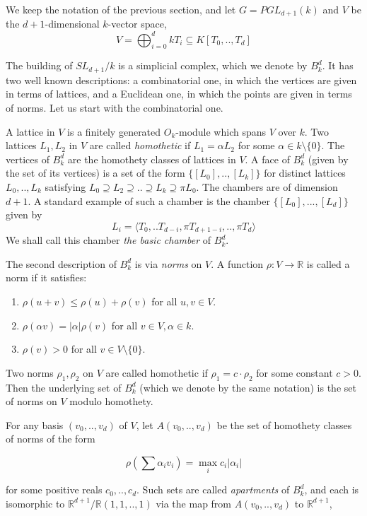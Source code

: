 \documentclass{amsart}
\theoremstyle{theorem}
\theoremstyle{lemma}
\theoremstyle{prop}
\theoremstyle{definition}
\theoremstyle{corollary}
\theoremstyle{remark}
\newcommand{\R}{\mathbb{R}}
\begin{document}
We keep the notation of the previous section, and let $G=PGL_{d+1}(k)$ and $V$ be the $d+1$-dimensional $k$-vector space,
$$ V=\bigoplus_{i=0}^d k T_i \subseteq K[T_0,..,T_d] $$ 

The building of $SL_{d+1}/k$ is a simplicial complex, which we denote by $B^d_k$. It has two well known descriptions: a combinatorial one, in which the vertices are given in terms of lattices, and a Euclidean one, in which the points are given in terms of norms. Let us start with the combinatorial one.

A lattice in $V$ is a finitely generated $O_k$-module which spans $V$ over $k$. Two lattices $L_1,L_2$ in $V$ are called \emph{homothetic} if $L_1 =\alpha  L_2$ for some $\alpha \in k \setminus \{0\}$. The vertices of $B^d_k$ are the homothety classes of lattices in $V$. A face of $B^d_k$ (given by the set of its vertices) is a set of the form $\{[L_0],..,[L_k]\}$ for distinct lattices $L_0,..,L_k$ satisfying $L_0 \supseteq L_2 \supseteq .. \supseteq L_k \supseteq \pi L_0$.
The chambers are of dimension $d+1$. A standard example of such a chamber is the chamber $\{[L_0],...,[L_d]\}$ given by $$L_i  = \langle T_0,..T_{d-i},\pi T_{d+1-i} ,.., \pi T_d \rangle $$ We shall call this chamber \emph{the basic chamber} of $B^d_k$.

The second description of $B^d_k$ is via \emph{norms} on $V$. A function $\rho:V\rightarrow \R$ is called a norm if it satisfies: 
\begin{enumerate}
\item $\rho(u+v)\leq \rho(u)+\rho(v)$ for all $u,v\in V$.
\item $\rho(\alpha v)=|\alpha|\rho(v)$ for all $v\in V, \alpha \in k$.
\item $\rho(v)>0$ for all $v \in V \setminus \{0\}$.
\end{enumerate}

Two norms $\rho_1,\rho_2$ on $V$ are called homothetic if $\rho_1=c\cdot \rho_2$ for some constant $c>0$. Then the underlying set of $B^d_k$ (which we denote by the same notation) is the set of norms on $V$ modulo homothety. 

For any basis $(v_0,..,v_d)$ of $V$, let $A(v_0,..,v_d)$ be the set of homothety classes of norms of the form 

$$ \rho(\sum \alpha_i v_i) = \max_i {c_i |\alpha_i|} $$

for some positive reals $c_0,..,c_d$. Such sets are called \emph{apartments} of $B^d_k$, and each is isomorphic to $\R^{d+1}/\R(1,1,..,1)$ via the map from $A(v_0,..,v_d)$ to $\R^{d+1}$, 
\end{document}
